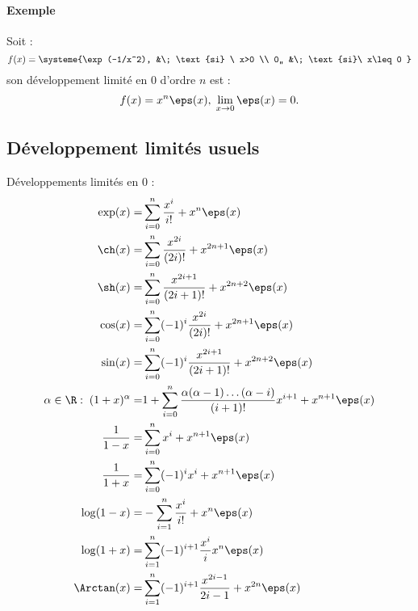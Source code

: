 \paragraph{Exemple}Soit : \[ f(x) = \systeme{\exp(-1/x^2), &\; \text{si} \ x>0 \\ 0,, &\; \text{si}\ x\leq 0 }\]son développement limité en $0$ d'ordre $n$ est : \[ f(x) =x^{n}\eps(x),\; \lim_{x\to 0}\eps(x) = 0.\]

\subsection{Développement limités usuels}
Développements limités en $0$ :
\begin{align*}
\exp(x) = &\sum_{i=0}^{n}\frac{x^{i}}{i!} + x^{n}\eps(x) \\
\ch(x) = &\sum_{i=0}^{n}\frac{x^{2i}}{(2i)!}+ x^{2n+1}\eps(x) \\
\sh(x) = &\sum_{i=0}^{n}\frac{x^{2i+1}}{(2i+1)!} + x^{2n+2}\eps(x) \\
\cos(x) =& \sum_{i=0}^{n}(-1)^{i}\frac{x^{2i}}{(2i)!} + x^{2n+1}\eps(x) \\
\sin(x) =& \sum_{i=0}^{n}(-1)^{i} \frac{x^{2i+1}}{(2i+1)!} + x^{2n+2}\eps(x) \\
\alpha\in \R : \;(1+x)^{\alpha} =& 1 +\sum_{i=0}^{n}\frac{\alpha(\alpha-1)\ldots(\alpha-i)}{(i+1)!}x^{i+1} + x^{n+1}\eps(x) \\
\frac{1}{1-x} =& \sum_{i=0}^{n}x^{i} + x^{n+1}\eps(x) \\
\frac{1}{1+x} =& \sum_{i=0}^{n}(-1)^{i}x^{i} + x^{n+1}\eps(x) \\
\log(1-x) =& -\sum_{i=1}^{n}\frac{x^{i}}{i!}+x^{n}\eps(x) \\
\log(1+x) =& \sum_{i=1}^{n}(-1)^{i+1}\frac{x^{i}}{i}x^{n}\eps(x)\\
\Arctan(x) =& \sum_{i=1}^{n}(-1)^{i+1}\frac{x^{2i-1}}{2i-1} +x^{2n}\eps(x)
\end{align*}



